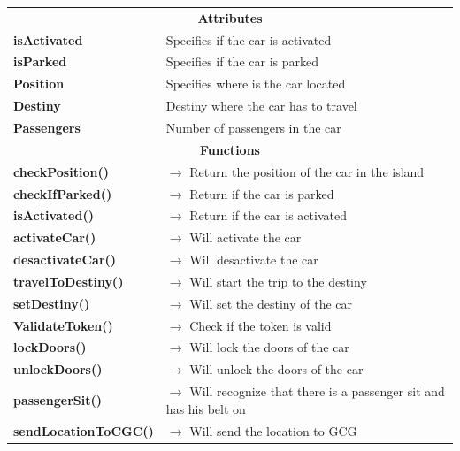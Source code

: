 \documentclass[12pt]{article}
\begin{document}
\begin{table}[H]
\begin{tabularx}{\hsize}{|X|X|}
    \hline
    \rowcolor{nicegreen}
    \multicolumn{2}{|c|}{\textbf{Car Class}} \\
    \hline
    \hline
    \multicolumn{2}{|c|}{\textbf{Attributes}}      \\
    \hline
    \textbf{isActivated} & Specifies if the car is activated \\
    \textbf{isParked} & Specifies if the car is parked \\
    \textbf{Position} & Specifies where is the car located \\
    \textbf{Destiny} & Destiny where the car has to travel\\
    \textbf{Passengers} & Number of passengers in the car\\
    \hline
    \multicolumn{2}{|c|}{\textbf{Functions}} \\
    \hline
    \textbf{checkPosition()} & $\rightarrow$ Return the position of the car in the island \\
    \textbf{checkIfParked()} & $\rightarrow$ Return if the car is parked \\
    \textbf{isActivated()} & $\rightarrow$ Return if the car is activated \\
    \textbf{activateCar()} & $\rightarrow$ Will activate the car \\
	\textbf{desactivateCar()} & $\rightarrow$ Will desactivate the car  \\
	\textbf{travelToDestiny()} & $\rightarrow$ Will start the trip to the destiny \\
    \textbf{setDestiny()} & $\rightarrow$ Will set the destiny of the car\\
	\textbf{ValidateToken()} & $\rightarrow$ Check if the token is valid \\
	\textbf{lockDoors()} & $\rightarrow$ Will lock the doors of the car \\
	\textbf{unlockDoors()} & $\rightarrow$ Will unlock the doors of the car \\
	\textbf{passengerSit()} & $\rightarrow$ Will recognize that there is a passenger sit and has his belt on \\
	\textbf{sendLocationToCGC()} & $\rightarrow$ Will send the location to GCG \\
    \hline

\end{tabularx}
\end{table}
\end{document}

